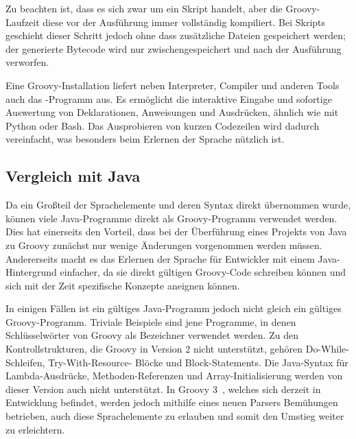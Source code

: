 \documentclass[a4paper]{article}
\begin{document}
Zu beachten ist, dass es sich zwar um ein Skript handelt, aber die Groovy-Laufzeit diese vor der Ausführung immer vollständig kompiliert.
Bei Skripts geschieht dieser Schritt jedoch ohne dass zusätzliche Dateien gespeichert werden;
der generierte Bytecode wird nur zwischengespeichert und nach der Ausführung verworfen.

Eine Groovy-Installation liefert neben Interpreter, Compiler und anderen Tools auch das -Programm aus.
Es ermöglicht die interaktive Eingabe und sofortige Auswertung von Deklarationen, Anweisungen und Ausdrücken, ähnlich wie mit Python oder Bash.
Das Ausprobieren von kurzen Codezeilen wird dadurch vereinfacht, was besonders beim Erlernen der Sprache nützlich ist.

\subsection{Vergleich mit Java}\label{subsec:vergleichMitJava}

Da ein Großteil der Sprachelemente und deren Syntax direkt übernommen wurde, können viele Java-Programme direkt als Groovy-Programm verwendet werden.
Dies hat einerseits den Vorteil, dass bei der Überführung eines Projekts von Java zu Groovy zunächst nur wenige Änderungen vorgenommen werden müssen.
Andererseits macht es das Erlernen der Sprache für Entwickler mit einem Java-Hintergrund einfacher, da sie direkt gültigen Groovy-Code schreiben können und sich mit der Zeit spezifische Konzepte aneignen können.

In einigen Fällen ist ein gültiges Java-Programm jedoch nicht gleich ein gültiges Groovy-Programm.
Triviale Beispiele sind jene Programme, in denen Schlüsselwörter von Groovy als Bezeichner verwendet werden.
Zu den Kontrollstrukturen, die Groovy in Version 2 nicht unterstützt, gehören Do-While-Schleifen, Try-With-Resource- Blöcke und Block-Statements.
Die Java-Syntax für Lambda-Ausdrücke, Methoden-Referenzen und Array-Initialisierung werden von dieser Version auch nicht unterstützt.
In Groovy 3~\cite{groovy-lang:release3}, welches sich derzeit in Entwicklung befindet, werden jedoch mithilfe eines neuen Parsers Bemühungen betrieben, auch diese Sprachelemente zu erlauben und somit den Umstieg weiter zu erleichtern.
\end{document}
